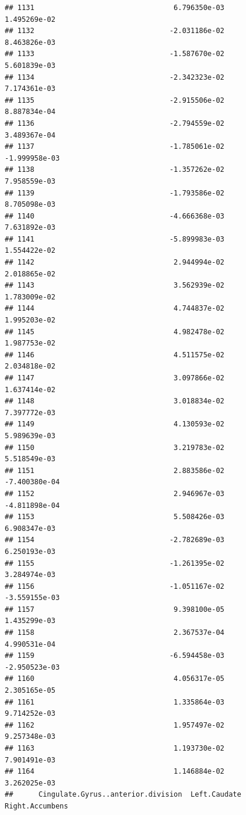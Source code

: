 \documentclass[
]{article}
\begin{document}
\begin{verbatim}
## 1131                                 6.796350e-03           1.495269e-02
## 1132                                -2.031186e-02           8.463826e-03
## 1133                                -1.587670e-02           5.601839e-03
## 1134                                -2.342323e-02           7.174361e-03
## 1135                                -2.915506e-02           8.887834e-04
## 1136                                -2.794559e-02           3.489367e-04
## 1137                                -1.785061e-02          -1.999958e-03
## 1138                                -1.357262e-02           7.958559e-03
## 1139                                -1.793586e-02           8.705098e-03
## 1140                                -4.666368e-03           7.631892e-03
## 1141                                -5.899983e-03           1.554422e-02
## 1142                                 2.944994e-02           2.018865e-02
## 1143                                 3.562939e-02           1.783009e-02
## 1144                                 4.744837e-02           1.995203e-02
## 1145                                 4.982478e-02           1.987753e-02
## 1146                                 4.511575e-02           2.034818e-02
## 1147                                 3.097866e-02           1.637414e-02
## 1148                                 3.018834e-02           7.397772e-03
## 1149                                 4.130593e-02           5.989639e-03
## 1150                                 3.219783e-02           5.518549e-03
## 1151                                 2.883586e-02          -7.400380e-04
## 1152                                 2.946967e-03          -4.811898e-04
## 1153                                 5.508426e-03           6.908347e-03
## 1154                                -2.782689e-03           6.250193e-03
## 1155                                -1.261395e-02           3.284974e-03
## 1156                                -1.051167e-02          -3.559155e-03
## 1157                                 9.398100e-05           1.435299e-03
## 1158                                 2.367537e-04           4.990531e-04
## 1159                                -6.594458e-03          -2.950523e-03
## 1160                                 4.056317e-05           2.305165e-05
## 1161                                 1.335864e-03           9.714252e-03
## 1162                                 1.957497e-02           9.257348e-03
## 1163                                 1.193730e-02           7.901491e-03
## 1164                                 1.146884e-02           3.262025e-03
##      Cingulate.Gyrus..anterior.division  Left.Caudate Right.Accumbens

\end{verbatim}
\end{document}
